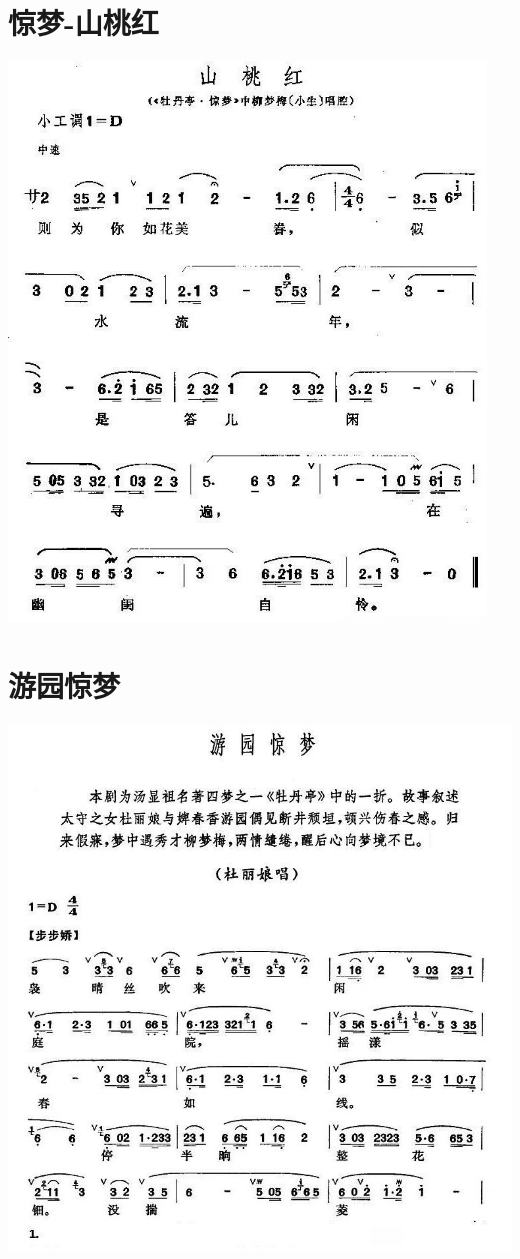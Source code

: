 \documentclass[cn,pad,twocol]{elegantbook}
\begin{document}
\section{惊梦-山桃红}
    \includegraphics[width=0.95\textwidth]{mudanting/2021-牡丹亭-惊梦-山桃红.jpg}
\section{游园惊梦}
\paragraph*{\includegraphics[width=\textwidth]{mudanting/2020-牡丹亭-游园惊梦1}} 
\end{document}
